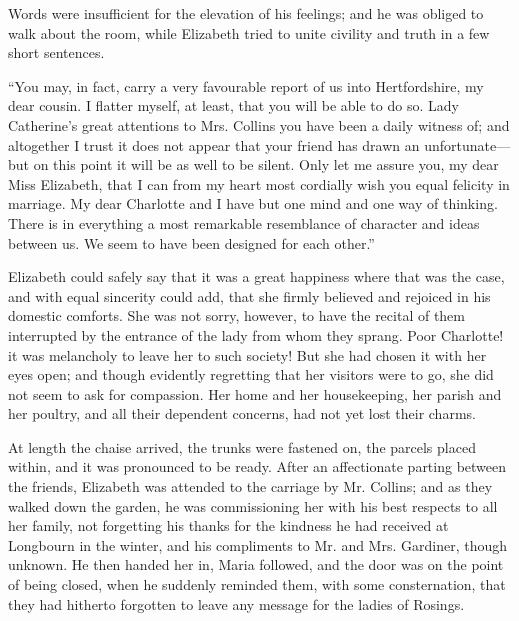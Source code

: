 \documentclass[10pt]{book}
\begin{document}
   Words were insufficient for the elevation of his feelings; and he was
obliged to walk about the room, while Elizabeth tried to unite civility
and truth in a few short sentences.
  

   “You may, in fact, carry a very favourable report of us
   into
Hertfordshire, my dear cousin. I flatter myself, at least, that you will
be able to do so. Lady Catherine’s great attentions to Mrs. Collins you
have been a daily witness of; and altogether I trust it does not appear
that your friend has drawn an unfortunate—but on this point it will be
as well to be silent. Only let me assure you, my dear Miss Elizabeth,
that I can from my heart most cordially wish you equal felicity in
marriage. My dear Charlotte and I have but one mind and one way of
thinking. There is in everything a most remarkable resemblance of
character and ideas between us. We seem to have been designed for each
other.”
  

   Elizabeth could safely say that it was a great happiness where that was
the case, and with equal sincerity could add, that she firmly believed
and rejoiced in his domestic comforts. She was not sorry, however, to
have the recital of them interrupted by the entrance of the lady from
whom they sprang. Poor Charlotte! it was melancholy to leave her to such
society! But she had chosen it with her eyes open; and though evidently
regretting that her visitors were to go, she did not seem to ask for
compassion. Her home and her housekeeping, her parish and her poultry,
and all their dependent concerns, had not yet lost their charms.
  

   At length the chaise arrived, the trunks were fastened on, the parcels
placed within, and it was pronounced to be ready. After an affectionate
parting between the friends, Elizabeth was attended to the carriage by
Mr. Collins; and as they walked down the garden, he was commissioning
her with his best respects to all her family, not forgetting his thanks
for the kindness he had received at Longbourn in the winter, and his
compliments to Mr. and Mrs. Gardiner, though unknown. He then handed
   her in, Maria followed, and the door was on the point of being closed,
when he suddenly reminded them, with some consternation, that they had
hitherto forgotten to leave any message for the ladies of Rosings.
  
\end{document}
